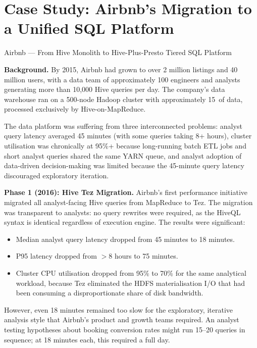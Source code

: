 \section{Case Study: Airbnb's Migration to a Unified SQL Platform}
\label{sec:airbnb-case}

\begin{casestudy}{Airbnb --- From Hive Monolith to Hive-Plus-Presto Tiered SQL Platform}

\textbf{Background.}
By 2015, Airbnb had grown to over 2 million listings and 40 million
users, with a data team of approximately 100 engineers and analysts
generating more than 10{,}000 Hive queries per day. The company's
data warehouse ran on a 500-node Hadoop cluster with approximately
15\PB\ of data, processed exclusively by Hive-on-MapReduce.

The data platform was suffering from three interconnected problems:
analyst query latency averaged 45 minutes (with some queries taking
8+ hours), cluster utilisation was chronically at 95\%+ because
long-running batch ETL jobs and short analyst queries shared the same
YARN queue, and analyst adoption of data-driven decision-making was
limited because the 45-minute query latency discouraged exploratory
iteration.

\smallskip
\textbf{Phase 1 (2016): Hive Tez Migration.}
Airbnb's first performance initiative migrated all analyst-facing Hive
queries from MapReduce to Tez. The migration was transparent to analysts:
no query rewrites were required, as the HiveQL syntax is identical
regardless of execution engine. The results were significant:

\begin{itemize}
  \item Median analyst query latency dropped from 45 minutes to 18 minutes.
  \item P95 latency dropped from $>$8 hours to 75 minutes.
  \item Cluster CPU utilisation dropped from 95\% to 70\% for the same
        analytical workload, because Tez eliminated the HDFS
        materialisation I/O that had been consuming a disproportionate
        share of disk bandwidth.
\end{itemize}

However, even 18 minutes remained too slow for the exploratory, iterative
analysis style that Airbnb's product and growth teams required. An analyst
testing hypotheses about booking conversion rates might run 15--20
queries in sequence; at 18 minutes each, this required a full day.


\end{casestudy}
